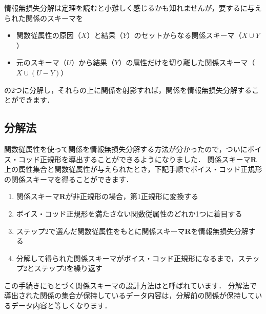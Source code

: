 情報無損失分解は定理を読むと小難しく感じるかも知れませんが，要するに与えられた関係のスキーマを
\begin{itemize}
\item 関数従属性の原因（$X$）と結果（$Y$）のセットからなる関係スキーマ（$X \cup Y$）
\item 元のスキーマ（$U$）から結果（$Y$）の属性だけを切り離した関係スキーマ（$X \cup (U - Y)$）
\end{itemize}
の2つに分解し，それらの上に関係を射影すれば，関係を情報無損失分解することができます．


\subsection{分解法}
関数従属性を使って関係を情報無損失分解する方法が分かったので，ついにボイス・コッド正規形を導出することができるようになりました．
関係スキーマ$\boldsymbol{R}$上の属性集合と関数従属性が与えられたとき，下記手順でボイス・コッド正規形の関係スキーマを得ることができます．
\begin{enumerate}
\item 関係スキーマ$\boldsymbol{R}$が非正規形の場合，第1正規形に変換する
\item ボイス・コッド正規形を満たさない関数従属性のどれか1つに着目する
\item ステップ2で選んだ関数従属性をもとに関係スキーマ$\boldsymbol{R}$を情報無損失分解する
\item 分解して得られた関係スキーマがボイス・コッド正規形になるまで，ステップ2とステップ3を繰り返す
\end{enumerate}

この手続きにもとづく関係スキーマの設計方法はと呼ばれています．
分解法で導出された関係の集合が保持しているデータ内容は，分解前の関係が保持しているデータ内容と等しくなります．

